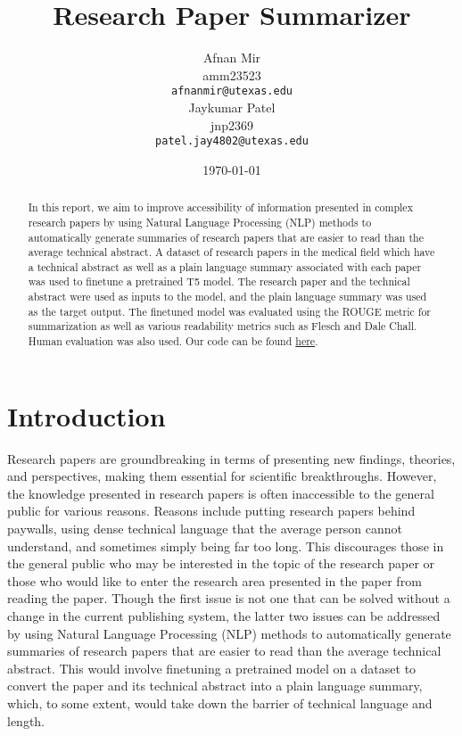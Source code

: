 \documentclass[11pt,a4paper]{article}
\title{Research Paper Summarizer}
\author{Afnan Mir \\
  amm23523 \\
  {\tt afnanmir@utexas.edu} \\\And
  Jaykumar Patel \\
  jnp2369 \\
  {\tt patel.jay4802@utexas.edu} \\}
\date{\today}
\begin{document}
\maketitle
\begin{abstract}
  In this report, we aim to improve accessibility of information presented in complex research papers by using Natural Language Processing (NLP) methods to automatically generate summaries of research papers that are easier to read than the average technical abstract. A dataset of research papers in the medical field which have a technical abstract as well as a plain language summary associated with each paper was used to finetune a pretrained T5 model. The research paper and the technical abstract were used as inputs to the model, and the plain language summary was used as the target output. The finetuned model was evaluated using the ROUGE metric for summarization as well as various readability metrics such as Flesch and Dale Chall. Human evaluation was also used. Our code can be found \href{https://github.com/afnanmmir/Research-Paper-Summarizer}{here}.
\end{abstract}

\section{Introduction}

\indent \indent Research papers are groundbreaking in terms of presenting new findings, theories, and perspectives, making them essential for scientific breakthroughs. However, the knowledge presented in research papers is often inaccessible to the general public for various reasons. Reasons include putting research papers behind paywalls, using dense technical language that the average person cannot understand, and sometimes simply being far too long. This discourages those in the general public who may be interested in the topic of the research paper or those who would like to enter the research area presented in the paper from reading the paper. Though the first issue is not one that can be solved without a change in the current publishing system, the latter two issues can be addressed by using Natural Language Processing (NLP) methods to automatically generate summaries of research papers that are easier to read than the average technical abstract. This would involve finetuning a pretrained model on a dataset to convert the paper and its technical abstract into a plain language summary, which, to some extent, would take down the barrier of technical language and length.
\end{document}
